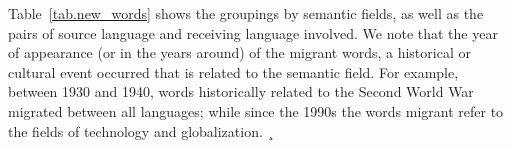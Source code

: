 \documentclass[10pt,letterpaper]{article} %
\begin{document}
	Table~\ref{tab.new_words} shows the groupings by semantic fields, as well as the pairs of source language and receiving language involved. We note that the year of appearance (or in the years around) of the migrant words, a historical or cultural event occurred that is related to the semantic field. For example, between 1930 and 1940, words historically related to the Second World War migrated between all languages; while since the 1990s the words migrant refer to the fields of technology and globalization.
	¸
	
	
\end{document}

